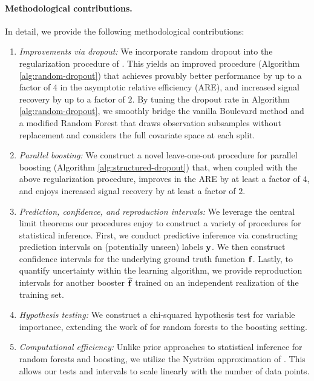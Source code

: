 \paragraph{Methodological contributions.} In detail, we provide the following methodological contributions:
\vspace{-3ex}
\begin{enumerate}[leftmargin=0.5cm]
    \item \emph{Improvements via dropout:} We incorporate random dropout \citep{rashmi2015dartdropoutsmeetmultiple} into the regularization procedure of \cite{zhou2022boulevard}. This yields an improved procedure (Algorithm \ref{alg:random-dropout}) that achieves provably better performance by up to a factor of $4$ in the asymptotic relative efficiency (ARE), and increased signal recovery by up to a factor of $2$. By tuning the dropout rate in Algorithm \ref{alg:random-dropout}, we smoothly bridge the vanilla Boulevard method \citep{zhou2022boulevard} and a modified Random Forest \citep{breiman2001random} that draws observation subsamples without replacement and considers the full covariate space at each split.
    \item \emph{Parallel boosting:} We construct a novel leave-one-out procedure for parallel boosting (Algorithm \ref{alg:structured-dropout}) that, when coupled with the above regularization procedure, improves in the ARE by at least a factor of $4$, and enjoys increased signal recovery by at least a factor of $2$.
    \item \emph{Prediction, confidence, and reproduction intervals:} We leverage the central limit theorems our procedures enjoy to construct a variety of procedures for statistical inference. 
    First, we conduct predictive inference via constructing prediction intervals on (potentially unseen) labels $\mathbf{y}$. We then construct confidence intervals for the underlying ground truth function $\mathbf{f}$. Lastly, to quantify uncertainty within the learning algorithm, we provide reproduction intervals \citep{zhou2022boulevard} for another booster $\widehat{\mathbf{f}}$ trained on an independent realization of the training set. 
    \item \emph{Hypothesis testing:} We construct a chi-squared hypothesis test for variable importance, extending the work of \cite{mentch2016randomforestci} for random forests to the boosting setting. 
    \item \emph{Computational efficiency:} Unlike prior approaches to statistical inference for random forests and boosting, we utilize the Nystr\"{o}m approximation of \cite{musco2017recursivenystrom}. This allows our tests and intervals to scale linearly with the number of data points.
\end{enumerate}

